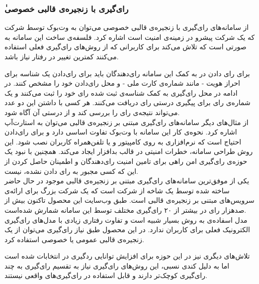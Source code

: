 \subsubsection{ٰرای‌گیری با زنجیره‌ی قالبی خصوصی}
از سامانه‌های رای‌گیری با زنجیره‌ی قالبی خصوصی می‌توان به وت‌بوک
\cite{votebook}
توسط شرکت 
که یک شرکت پیشرو در زمینه‌ی امنیت است اشاره کرد. فلسفه‌ی ساخت این سامانه به صورتی است که تلاش می‌کند برای کاربرانی که از روش‌های رای‌گیری فعلی استفاده می‌کنند کمترین تغییر در رفتار نیاز باشد.
\par 
 برای رای دادن در به کمک این سامانه رای‌دهندگان باید برای رای‌دادن یک شناسه‌ برای احراز هویت - مانند شماره‌ی کارت ملی - و محل رای‌دادن خود را مشخص کنند. در ادامه در محل رای‌گیری به کمک شناسه‌ی ثبت شده رای خود را ثبت می‌کنند و یک شماره‌ی رای برای پیگیری درستی رای دریافت می‌کنند. هر کسی با داشتن این دو عدد می‌تواند نتیجه‌ی رای را بررسی کند و از درستی آن آگاه شود. 
\\
از مثال‌های دیگر سامانه‌های رای‌گیری مبتنی بر زنجیره‌ی قالبی می‌توان به استارت‌آپ 
اشاره کرد. نحوه‌ی کار این سامانه با  
وت‌بوک
تفاوت اساسی دارد و برای رای‌دادن احتیاج است که نرم‌‌افزاری به روی کامپیتور و یا تلفن‌همراه کاربران نصب شود. این روش طراحی سامانه،‌ خطرات امنیتی در قالب بدافزار ایجاد می‌کند. همچنین با نبود یک حوزه‌ی رای‌گیری امن راهی برای تامین امنیت رای‌دهندگان و اطمینان حاصل کردن از این که کسی مجبور به رای‌ دادن نشده، نیست.
\\
یکی از موفق‌ترین سامانه‌های رای‌گیری مبتنی بر زنجیره‌ی قالبی موجود در حال حاضر 
ساخته شده توسط یک شاخه از شرکت 
است که یک شرکت بزرگ برای ارائه‌ی سرویس‌های مبتنی بر زنجیره‌ی قالبی است. طبق وب‌سایت این محصول تاکنون بیش از صدهزار رای در بیشتر از ۲۰ رای‌گیری مختلف توسط این سامانه‌ شمارش شده‌است. 
\\
مدل اسفاده‌ی 
به روش‌ 
بسیار شبیه است و تفاوت رفتاری زیادی با مدل‌های رای‌گیری الکترونیک فعلی برای کاربران ندارد. در این محصول طبق نیاز رای‌گیری می‌توان از یک زنجیره‌ی قالبی عمومی یا خصوصی استفاده کرد.
\par
تلاش‌های دیگری نیز در این حوزه برای افزایش توانایی ردگیری در انتخابات شده است
\cite{privblock}
اما به دلیل کندی نسبی، این روش‌های رای‌گیری نیاز به تقسیم رای‌گیری به چند رای‌گیری کوچک‌تر دارند و قابل استفاده در رای‌گیری‌های واقعی نیستند.


